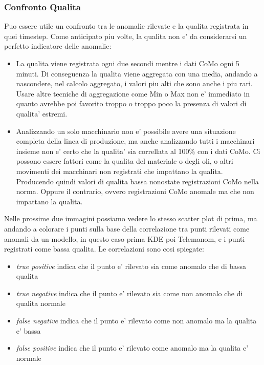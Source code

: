 \subsubsection{Confronto Qualita}
Puo essere utile un confronto tra le anomalie rilevate e la qualita registrata in quei timestep. Come anticipato piu volte, la qualita non e' da considerarsi un perfetto indicatore delle anomalie: 
\begin{itemize}
	\item La qualita viene registrata ogni due secondi mentre i dati CoMo ogni 5 minuti. Di conseguenza la qualita viene aggregata con una media, andando a nascondere, nel calcolo aggregato, i valori piu alti che sono anche i piu rari. Usare altre tecniche di aggregazione come Min o Max non e' immediato in quanto avrebbe poi favorito troppo o troppo poco la presenza di valori di qualita' estremi.
	\item Analizzando un solo macchinario non e' possibile avere una situazione completa della linea di produzione, ma anche analizzando tutti i macchinari insieme non e' certo che la qualita' sia correllata al 100\% con i dati CoMo. Ci possono essere fattori come la qualita del materiale o degli oli, o altri movimenti dei macchinari non registrati che impattano la qualita. Producendo quindi valori di qualita bassa nonostate registrazioni CoMo nella norma. Oppure il contrario, ovvero registrazioni CoMo anomale ma che non impattano la qualita.
\end{itemize}


Nelle prossime due immagini possiamo vedere lo stesso scatter plot di prima, ma andando a colorare i punti sulla base della correlazione tra punti rilevati come anomali da un modello, in questo caso prima KDE poi Telemanom, e i punti registrati come bassa qualita. Le correlazioni sono cosi spiegate:
\begin{itemize}
	\item \textit{true positive} indica che il punto e' rilevato sia come anomalo che di bassa qualita
	\item \textit{true negative} indica che il punto e' rilevato sia come non anomalo che di qualita normale
	\item \textit{false negative} indica che il punto e' rilevato come non anomalo ma la qualita e' bassa
	\item \textit{false positive} indica che il punto e' rilevato come anomalo ma la qualita e' normale
\end{itemize}

